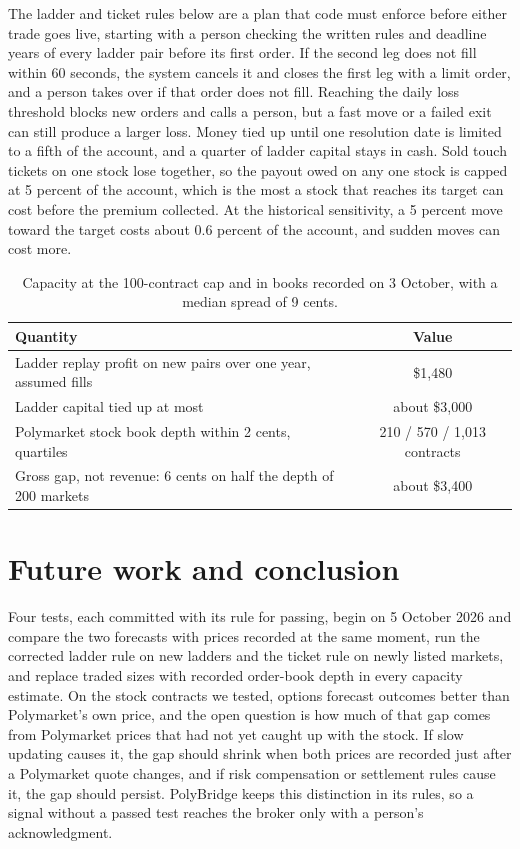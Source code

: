 \documentclass[11pt]{article}
\begin{document}
The ladder and ticket rules below are a plan that code must enforce before either trade goes live, starting with a person checking the written rules and deadline years of every ladder pair before its first order. If the second leg does not fill within 60 seconds, the system cancels it and closes the first leg with a limit order, and a person takes over if that order does not fill. Reaching the daily loss threshold blocks new orders and calls a person, but a fast move or a failed exit can still produce a larger loss. Money tied up until one resolution date is limited to a fifth of the account, and a quarter of ladder capital stays in cash. Sold touch tickets on one stock lose together, so the payout owed on any one stock is capped at 5 percent of the account, which is the most a stock that reaches its target can cost before the premium collected. At the historical sensitivity, a 5 percent move toward the target costs about 0.6 percent of the account, and sudden moves can cost more.

\begin{table}[H]
\centering
\caption{Capacity at the 100-contract cap and in books recorded on 3 October, with a median spread of 9 cents.}
\label{tab:cap}
\begin{tabular}{lc}
\toprule
Quantity & Value \\
\midrule
Ladder replay profit on new pairs over one year, assumed fills & \$1,480 \\
Ladder capital tied up at most & about \$3,000 \\
Polymarket stock book depth within 2 cents, quartiles & 210 / 570 / 1,013 contracts \\
Gross gap, not revenue: 6 cents on half the depth of 200 markets & about \$3,400 \\
\bottomrule
\end{tabular}
\end{table}

\section{Future work and conclusion}\label{sec:future}
Four tests, each committed with its rule for passing, begin on 5 October 2026 and compare the two forecasts with prices recorded at the same moment, run the corrected ladder rule on new ladders and the ticket rule on newly listed markets, and replace traded sizes with recorded order-book depth in every capacity estimate. On the stock contracts we tested, options forecast outcomes better than Polymarket's own price, and the open question is how much of that gap comes from Polymarket prices that had not yet caught up with the stock. If slow updating causes it, the gap should shrink when both prices are recorded just after a Polymarket quote changes, and if risk compensation or settlement rules cause it, the gap should persist. PolyBridge keeps this distinction in its rules, so a signal without a passed test reaches the broker only with a person's acknowledgment.
\end{document}
